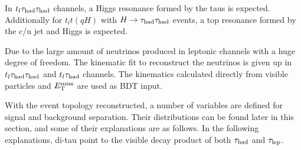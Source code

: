 


In $t_l\tau_\text{had}{}\tau_\text{had}$ channels, a Higgs resonance formed by the taus is expected. Additionally for $t_lt(qH)$ with $H\to \tau_\text{had}{}\tau_\text{had}$ events, a top resonance formed by the c/u jet and Higgs is expected.

Due to the large amount of neutrinos produced in leptonic channels with a huge degree of freedom. The kinematic fit to reconstruct the neutrinos is given up in $t_l\tau_\text{had}{}\tau_\text{had}$ and $t_l\tau_\text{had}$ channels. The kinematics calculated directly from visible particles and $E_{\text{T}}^{\text{miss}}$ are used as BDT input.

With the event topology reconstructed, a number of variables are defined for signal and background separation. Their distributions can be found later in this section, and some of their explanations are as follows. In the following explanations, di-tau point to the visible decay product of both $\tau_\text{had}$ and $\tau_\text{lep}$.

